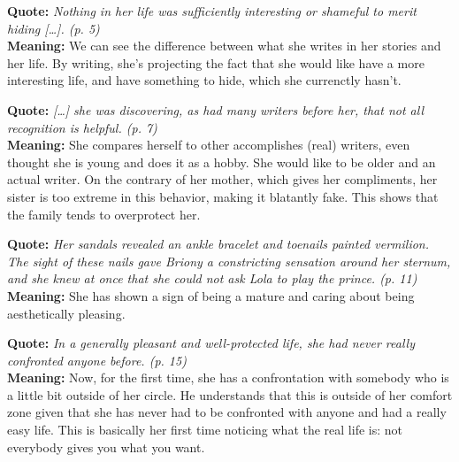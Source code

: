 \documentclass[a4paper]{article}
\newcommand*\circled[1]{\tikz[baseline=(char.base)]{
            \node[shape=circle,draw,inner sep=2pt] (char) {#1};}}
\newcommand\hr{\par\vspace{-.5\ht\strutbox}\noindent\hrulefill\par}
\begin{document}
\hr
\begin{minipage}[l]{0.05\textwidth}
    \circled{5}
\end{minipage}
\begin{minipage}[r]{0.95\textwidth}
    \textbf{Quote:} \textit{
        Nothing in her life was sufficiently interesting or
        shameful to merit hiding […]. (p. 5)
    }
    \\
    \textbf{Meaning:} We can see the difference between what she writes in her stories and her life.
    By writing, she's projecting the fact that she would like have a more interesting life,
    and have something to hide, which she currenctly hasn't.
\end{minipage}
\hr
\begin{minipage}[l]{0.05\textwidth}
    \circled{6}
\end{minipage}
\begin{minipage}[r]{0.95\textwidth}
    \textbf{Quote:} \textit{
        […] she was discovering, as had many writers before her,
        that not all recognition is helpful. (p. 7)
    }
    \\
    \textbf{Meaning:} She compares herself to other accomplishes (real) writers, even thought she is
    young and does it as a hobby. She would like to be older and an actual writer.
    On the contrary of her mother, which gives her compliments, her sister is too extreme
    in this behavior, making it blatantly fake.
    This shows that the family tends to overprotect her.
\end{minipage}
\hr
\begin{minipage}[l]{0.05\textwidth}
    \circled{7}
\end{minipage}
\begin{minipage}[r]{0.95\textwidth}
    \textbf{Quote:} \textit{
        Her sandals revealed an ankle bracelet and toenails
        painted vermilion. The sight of these nails gave Briony a
        constricting sensation around her sternum, and she knew
        at once that she could not ask Lola to play the prince. (p.
        11)
    }
    \\
    \textbf{Meaning:} She has shown a sign of being a mature and caring about being aesthetically pleasing.
\end{minipage}
\hr
\begin{minipage}[l]{0.05\textwidth}
    \circled{8}
\end{minipage}
\begin{minipage}[r]{0.95\textwidth}
    \textbf{Quote:} \textit{
        In a generally pleasant and well-protected life, she had
        never really confronted anyone before. (p. 15)
    }
    \\
    \textbf{Meaning:}
    Now, for the first time, she has a confrontation with somebody who is a little bit outside of her
    circle. He understands that this is outside of her comfort zone given that she has never had
    to be confronted with anyone and had a really easy life.
    This is basically her first time noticing what the real life is: not everybody gives you what you want.
\end{minipage}
\end{document}
